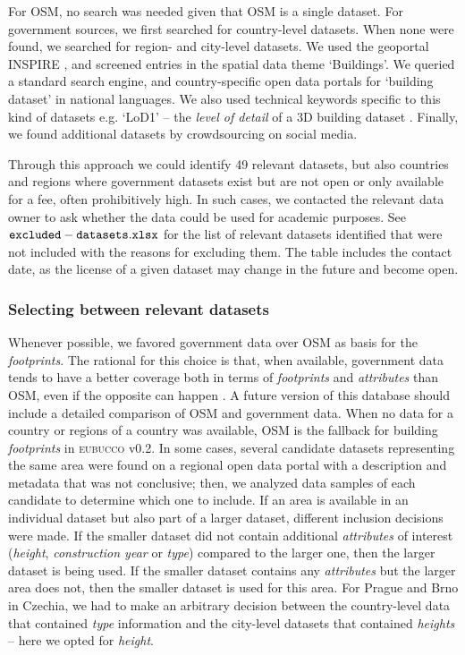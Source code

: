 \documentclass[fleqn,10pt]{wlscirep}
\begin{document}
For OSM, no search was needed given that OSM is a single dataset. For government sources, we first searched for country-level datasets. When none were found, we searched for region- and city-level datasets.
We used the geoportal INSPIRE \cite{inspire2022}, and screened entries in the spatial data theme `Buildings'. 
We queried a standard search engine, and country-specific open data portals for `building dataset' in national languages. We also used technical keywords specific to this kind of datasets e.g. `LoD1' -- the \textit{level of detail} of a 3D building dataset \cite{biljecki2016improved}. Finally, we found additional datasets by crowdsourcing on social media.

Through this approach we could identify 49 relevant datasets, but also countries and regions where government datasets exist but are not open or only available for a fee, often prohibitively high. In such cases, we contacted the relevant data owner to ask whether the data could be used for academic purposes.  See ${\tt excluded-datasets.xlsx}$ for the list of relevant datasets identified that were not included with the reasons for excluding them. The table includes the contact date, as the license of a given dataset may change in the future and become open.


\subsubsection*{Selecting between relevant datasets}

Whenever possible, we favored government data over OSM as basis for the \textit{footprints}. The rational for this choice is that, when available, government data tends to have a better coverage both in terms of \textit{footprints} and \textit{attributes} than OSM, even if the opposite can happen \cite{Antoniou:2015hl,Minghini.2019}. A future version of this database should include a detailed comparison of OSM and government data. When no data for a country or regions of a country was available, OSM is the fallback for building \textit{footprints} in \textsc{eubucco} v0.2. In some cases, several candidate datasets representing the same area were found on a regional open data portal with a description and metadata that was not conclusive; then, we analyzed data samples of each candidate to determine which one to include.  If an area is available in an individual dataset but also part of a larger dataset, different inclusion decisions were made. If the smaller dataset did not contain additional \textit{attributes} of interest (\textit{height}, \textit{construction year} or \textit{type}) compared to the larger one, then the larger dataset is being used. If the smaller dataset contains any \textit{attributes} but the larger area does not, then the smaller dataset is used for this area. For Prague and Brno in Czechia, we had to make an arbitrary decision between the country-level data that contained \textit{type} information and the city-level datasets that contained \textit{heights} -- here we opted for \textit{height}.  
\end{document}
